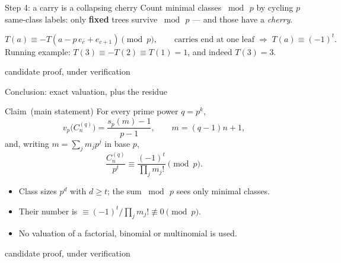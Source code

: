 \documentclass[aspectratio=169,11pt]{beamer}
\newcommand{\claimstatus}{candidate proof, under verification}
\newcommand{\ourresult}{Claim}
\newcommand{\status}{\par\vfill{\tiny\color{gray}\claimstatus\par}}
\newcommand{\vp}{v_p}
\newcommand{\sd}{s_p}
\newcommand{\Cq}{C_n^{(q)}}
\begin{document}
\begin{frame}{Step 4: a carry is a collapsing cherry}
  Count minimal classes $\bmod\,p$ by cycling $p$ same-class labels:
  only \textbf{fixed} trees survive $\bmod\,p$ --- and those have a \emph{cherry}.
  \begin{center}
  \qquad
  \end{center}
  \[
    T(a)\equiv -T(a-p\,e_c+e_{c+1})\pmod p,\qquad
    \text{carries end at one leaf}\;\Rightarrow\;T(a)\equiv(-1)^t .
  \]
  Running example: $T(3)\equiv -T(2)\equiv T(1)=1$, and indeed $T(3)=3$.
  \status
\end{frame}

\begin{frame}{Conclusion: exact valuation, plus the residue}
  \begin{block}{\ourresult\ (main statement)}
    For every prime power $q=p^k$,
    \[
      \vp\!\bigl(\Cq\bigr)=\frac{\sd(m)-1}{p-1},
      \qquad m=(q-1)n+1,
    \]
    and, writing $m=\sum_j m_jp^j$ in base $p$,
    \[
      \frac{\Cq}{p^t}\equiv\frac{(-1)^t}{\prod_j m_j!}\pmod p .
    \]
  \end{block}
  \begin{itemize}
    \item Class sizes $p^d$ with $d\ge t$; the sum $\bmod\,p$ sees only minimal classes.
    \item Their number is $\equiv(-1)^t/\prod_j m_j!\not\equiv 0\pmod p$.
    \item No valuation of a factorial, binomial or multinomial is used.
  \end{itemize}
  \status
\end{frame}
\end{document}
